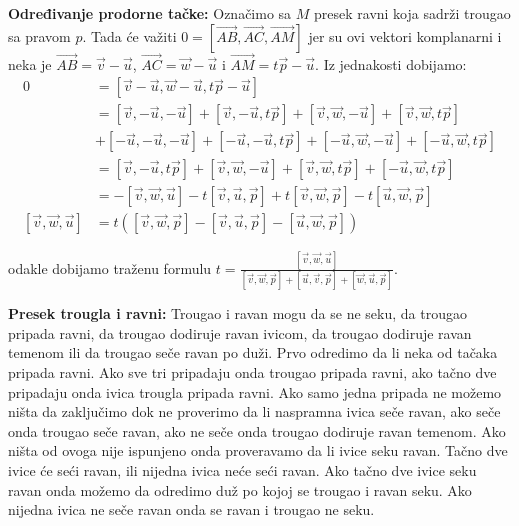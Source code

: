 \documentclass[12pt]{article}
\newcommand{\vek}[1]{\overrightarrow{#1}}
\begin{document}
\textbf{Određivanje prodorne tačke:} Označimo sa $M$ presek ravni koja sadrži
trougao sa pravom $p$. Tada će važiti $0=[\vek{AB},\vek{AC},\vek{AM}]$ jer su
ovi vektori komplanarni i neka je $\vek{AB}=\vek{v}-\vek{u}$,
$\vek{AC}=\vek{w}-\vek{u}$ i $\vek{AM}=t\vek{p}-\vek{u}$. Iz jednakosti
dobijamo:
\begin{align*}
    0                         & = [\vek{v}-\vek{u},\vek{w}-\vek{u},t\vek{p}-\vek{u}]                              \\
                              & = [\vek{v},-\vek{u},-\vek{u}]+[\vek{v},-\vek{u},t\vek{p}]+
    [\vek{v},\vek{w},-\vek{u}]+[\vek{v},\vek{w},t\vek{p}]                                                         \\
                              & + [-\vek{u},-\vek{u},-\vek{u}]+[-\vek{u},-\vek{u},t\vek{p}]+
    [-\vek{u},\vek{w},-\vek{u}]+[-\vek{u},\vek{w},t\vek{p}]                                                       \\
                              & =[\vek{v},-\vek{u},t\vek{p}]+[\vek{v},\vek{w},-\vek{u}]+
    [\vek{v},\vek{w},t\vek{p}]+[-\vek{u},\vek{w},t\vek{p}]                                                        \\
                              & =-[\vek{v},\vek{w},\vek{u}]-t[\vek{v},\vek{u},\vek{p}]+
    t[\vek{v},\vek{w},\vek{p}]-t[\vek{u},\vek{w},\vek{p}]                                                         \\
    [\vek{v},\vek{w},\vek{u}] & =t([\vek{v},\vek{w},\vek{p}]-[\vek{v},\vek{u},\vek{p}]-[\vek{u},\vek{w},\vek{p}])
\end{align*}

odakle dobijamo traženu formulu
$t=\frac{[\vek{v},\vek{w},\vek{u}]}{[\vek{v},\vek{w},\vek{p}]+[\vek{u},\vek{v},\vek{p}]+[\vek{w},\vek{u},\vek{p}]}$.
\par

\textbf{Presek trougla i ravni:} Trougao i ravan mogu da se ne seku, da trougao
pripada ravni, da trougao dodiruje ravan ivicom, da trougao dodiruje ravan
temenom ili da trougao seče ravan po duži. Prvo odredimo da li neka od tačaka
pripada ravni. Ako sve tri pripadaju onda trougao pripada ravni, ako tačno
dve pripadaju onda ivica trougla pripada ravni. Ako samo jedna pripada ne
možemo ništa da zaključimo dok ne proverimo da li naspramna ivica seče ravan,
ako seče onda trougao seče ravan, ako ne seče onda trougao dodiruje ravan
temenom. Ako ništa od ovoga nije ispunjeno onda proveravamo da li ivice seku
ravan. Tačno dve ivice će seći ravan, ili nijedna ivica neće seći ravan. Ako
tačno dve ivice seku ravan onda možemo da odredimo duž po kojoj se trougao
i ravan seku. Ako nijedna ivica ne seče ravan onda se ravan i trougao ne seku.
\end{document}
